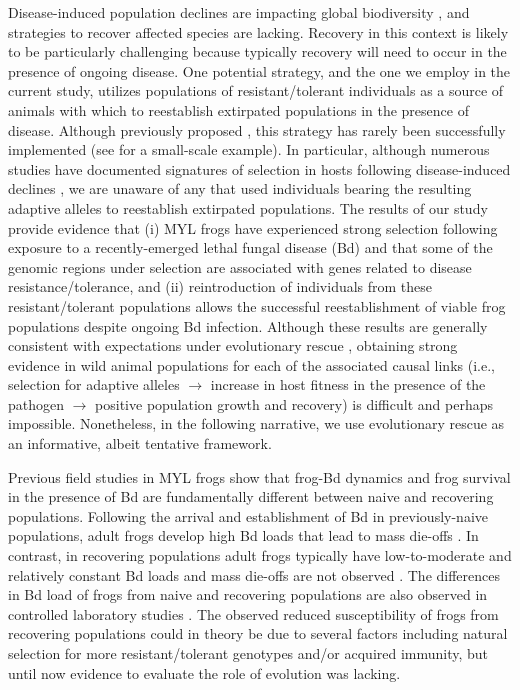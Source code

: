 \documentclass[9pt,twocolumn,twoside,lineno]{pnas-new}
\begin{document}
Disease-induced population declines are impacting global biodiversity
\citep{daszak2000}, and strategies to recover affected species are
lacking. Recovery in this context is likely to be particularly
challenging because typically recovery will need to occur in the
presence of ongoing disease. One potential strategy, and the one we
employ in the current study, utilizes populations of resistant/tolerant
individuals as a source of animals with which to reestablish extirpated
populations in the presence of disease. Although previously proposed
\citep{mendelson2019}, this strategy has rarely been successfully
implemented (see \citep{joseph2018} for a small-scale example). In
particular, although numerous studies have documented signatures of
selection in hosts following disease-induced declines
\citep[e.g.,][]{epstein2016, gignoux-wolfsohn2021}, we are unaware of
any that used individuals bearing the resulting adaptive alleles to
reestablish extirpated populations. The results of our study provide
evidence that (i) MYL frogs have experienced strong selection following
exposure to a recently-emerged lethal fungal disease (Bd) and that some
of the genomic regions under selection are associated with genes related
to disease resistance/tolerance, and (ii) reintroduction of individuals
from these resistant/tolerant populations allows the successful
reestablishment of viable frog populations despite ongoing Bd infection.
Although these results are generally consistent with expectations under
evolutionary rescue \citep{carlson2014}, obtaining strong evidence in
wild animal populations for each of the associated causal links (i.e.,
selection for adaptive alleles \(\rightarrow\) increase in host fitness
in the presence of the pathogen \(\rightarrow\) positive population
growth and recovery) is difficult and perhaps impossible. Nonetheless,
in the following narrative, we use evolutionary rescue as an
informative, albeit tentative framework.

Previous field studies in MYL frogs show that frog-Bd dynamics and frog
survival in the presence of Bd are fundamentally different between naive
and recovering populations. Following the arrival and establishment of
Bd in previously-naive populations, adult frogs develop high Bd loads
that lead to mass die-offs \citep{vredenburg2010}. In contrast, in
recovering populations adult frogs typically have low-to-moderate and
relatively constant Bd loads and mass die-offs are not observed
\citep[see also Figure S5 - before
translocation]{briggs2010, knapp2011}. The differences in Bd load of
frogs from naive and recovering populations are also observed in
controlled laboratory studies \citep[Figure 4]{knapp2016}. The observed
reduced susceptibility of frogs from recovering populations could in
theory be due to several factors including natural selection for more
resistant/tolerant genotypes and/or acquired immunity, but until now
evidence to evaluate the role of evolution was lacking.
\end{document}

